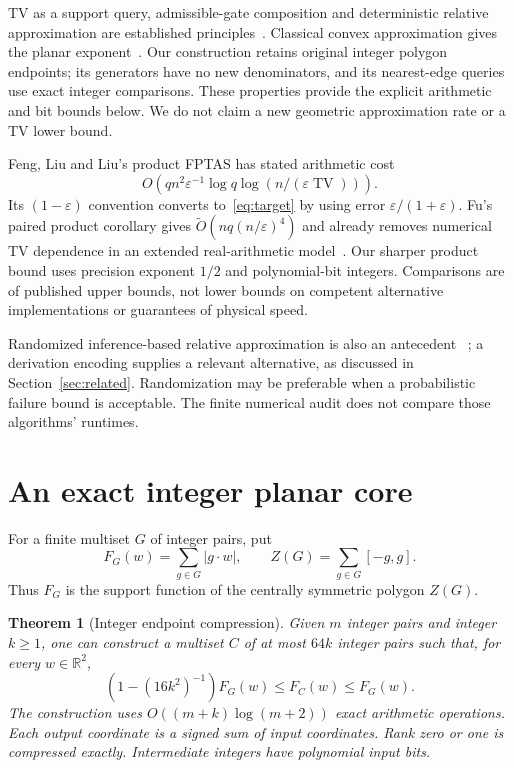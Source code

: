 \documentclass[11pt]{article}
\newtheorem{theorem}{Theorem}
\newcommand{\TV}{\operatorname{TV}}
\begin{document}
TV as a support query, admissible-gate composition and deterministic relative
approximation are established principles~\cite{fu}. Classical convex
approximation gives the planar exponent~\cite{dudley}. Our construction
retains original integer polygon endpoints; its generators have no new
denominators, and its nearest-edge queries use exact integer comparisons.
These properties provide the explicit arithmetic and bit bounds below.
We do not claim a new geometric approximation rate or a TV lower bound.

Feng, Liu and Liu's product FPTAS has stated arithmetic cost~\cite[Theorem 1]{feng}
\[
 O(qn^2\varepsilon^{-1}\log q\log(n/(\varepsilon\TV))).
\]
Its $(1-\varepsilon)$ convention converts to~\eqref{eq:target} by using
error $\varepsilon/(1+\varepsilon)$. Fu's paired product corollary gives
$\widetilde O(nq(n/\varepsilon)^4)$ and already removes numerical TV dependence
in an extended real-arithmetic model~\cite[Corollary 1.4]{fu}.
Our sharper product bound uses precision exponent $1/2$ and polynomial-bit
integers. Comparisons are of published upper bounds, not lower bounds on
competent alternative implementations or guarantees of physical speed.

Randomized inference-based relative approximation is also an antecedent
~\cite{inference}; a derivation encoding supplies a relevant alternative,
as discussed in Section~\ref{sec:related}. Randomization may be preferable
when a probabilistic failure bound is acceptable. The finite numerical audit
does not compare those algorithms' runtimes.

\section{An exact integer planar core}
For a finite multiset $G$ of integer pairs, put
\[
 F_G(w)=\sum_{g\in G}|g\cdot w|,
 \qquad Z(G)=\sum_{g\in G}[-g,g].
\]
Thus $F_G$ is the support function of the centrally symmetric polygon $Z(G)$.

\begin{theorem}[Integer endpoint compression]\label{thm:planar}
Given $m$ integer pairs and integer $k\geq1$, one can construct a multiset
$C$ of at most $64k$ integer pairs such that, for every $w\in\mathbb R^2$,
\begin{equation}\label{eq:core}
 (1-(16k^2)^{-1})F_G(w)\leq F_C(w)\leq F_G(w).
\end{equation}
The construction uses $O((m+k)\log(m+2))$ exact arithmetic operations.
Each output coordinate is a signed sum of input coordinates. Rank zero or
one is compressed exactly. Intermediate integers have polynomial input bits.
\end{theorem}
\end{document}
